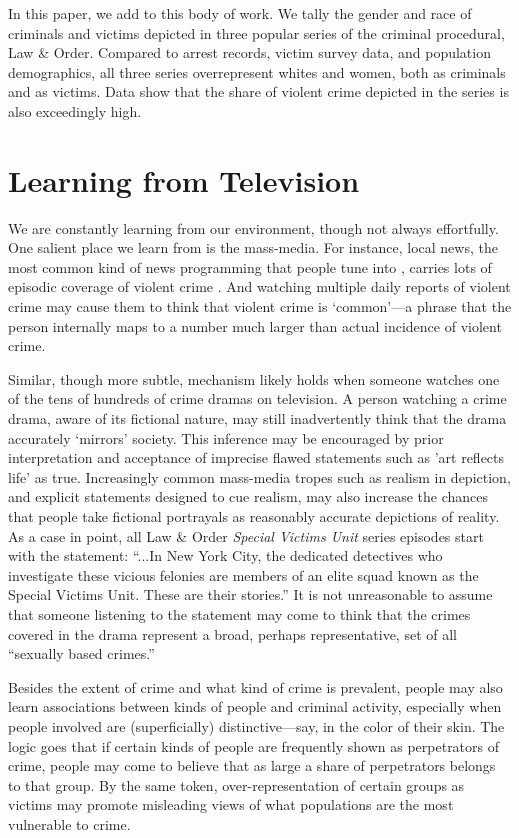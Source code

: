 \documentclass[12pt, letterpaper]{article}
\begin{document}
In this paper, we add to this body of work. We tally the gender and race of criminals and victims depicted in three popular series of the criminal procedural, Law \& Order. Compared to arrest records, victim survey data, and population demographics, all three series overrepresent whites and women, both as criminals and as victims. Data show that the share of violent crime depicted in the series is also exceedingly high.

\section*{Learning from Television}

We are constantly learning from our environment, though not always effortfully. One salient place we learn from is the mass-media. For instance, local news, the most common kind of news programming that people tune into \citep{pew2004}, carries lots of episodic coverage of violent crime \citep[see, for instance,][]{gross2006covering, klite1997local}. And watching multiple daily reports of violent crime may cause them to think that violent crime is `common'---a phrase that the person internally maps to a number much larger than actual incidence of violent crime.

Similar, though more subtle, mechanism likely holds when someone watches one of the tens of hundreds of crime dramas on television. A person watching a crime drama, aware of its fictional nature, may still inadvertently think that the drama accurately `mirrors' society. This inference may be encouraged by prior interpretation and acceptance of imprecise flawed statements such as 'art reflects life' as true. Increasingly common mass-media tropes such as realism in depiction, and explicit statements designed to cue realism, may also increase the chances that people take fictional portrayals as reasonably accurate depictions of reality. As a case in point, all Law \& Order \textit{Special Victims Unit} series episodes start with the statement: ``...In New York City, the dedicated detectives who investigate these vicious felonies are members of an elite squad known as the Special Victims Unit. These are their stories.'' It is not unreasonable to assume that someone listening to the statement may come to think that the crimes covered in the drama represent a broad, perhaps representative, set of all ``sexually based crimes.''

Besides the extent of crime and what kind of crime is prevalent, people may also learn associations between kinds of people and criminal activity, especially when people involved are (superficially) distinctive---say, in the color of their skin. The logic goes that if certain kinds of people are frequently shown as perpetrators of crime, people may come to believe that as large a share of perpetrators belongs to that group. By the same token, over-representation of certain groups as victims may promote misleading views of what populations are the most vulnerable to crime.
\end{document}
